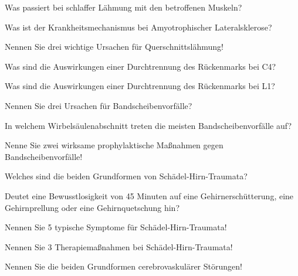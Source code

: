 \documentclass[10pt, a4paper]{exam}
\begin{document}
\begin{questions}
  \begin{solution}
  \end{solution}
  \question Was passiert bei schlaffer Lähmung mit den betroffenen Muskeln?
  \begin{solution}
  \end{solution}
  \question Was ist der Krankheitsmechanismus bei Amyotrophischer Lateralsklerose?
  \begin{solution}
  \end{solution}
  \question Nennen Sie drei wichtige Ursachen für Querschnittslähmung!
  \begin{solution}
  \end{solution}
  \question Was sind die Auswirkungen einer Durchtrennung des Rückenmarks bei C4?
  \begin{solution}
  \end{solution}
  \question Was sind die Auswirkungen einer Durchtrennung des Rückenmarks bei L1?
  \begin{solution}
  \end{solution}
  \question Nennen Sie drei Ursachen für Bandscheibenvorfälle?
  \begin{solution}
  \end{solution}
  \question In welchem Wirbelsäulenabschnitt treten die meisten Bandscheibenvorfälle auf?
  \begin{solution}
  \end{solution}
  \question Nenne Sie zwei wirksame prophylaktische Maßnahmen gegen Bandscheibenvorfälle!
  \begin{solution}
  \end{solution}
  \question Welches sind die beiden Grundformen von Schädel-Hirn-Traumata?
  \begin{solution}
  \end{solution}
  \question Deutet eine Bewusstlosigkeit von 45 Minuten auf eine Gehirnerschütterung, eine Gehirnprellung oder eine Gehirnquetschung hin?
  \begin{solution}
  \end{solution}
  \question Nennen Sie 5 typische Symptome für Schädel-Hirn-Traumata!
  \begin{solution}
  \end{solution}
  \question Nennen Sie 3 Therapiemaßnahmen bei Schädel-Hirn-Traumata!
  \begin{solution}
  \end{solution}
  \question Nennen Sie die beiden Grundformen cerebrovaskulärer Störungen!
  \begin{solution}

\end{solution}
\end{questions}
\end{document}
